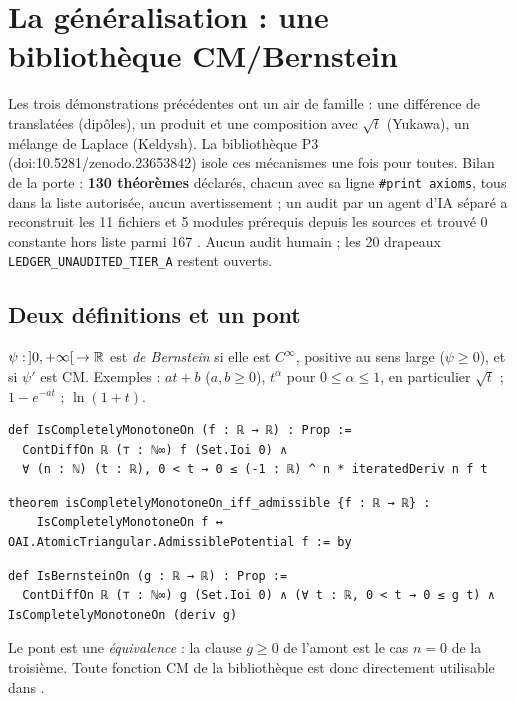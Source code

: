 \section{La généralisation : une bibliothèque CM/Bernstein}\label{ch2:sec:lib}

Les trois démonstrations précédentes ont un air de famille : une différence de translatées (dipôles), un produit et une
composition avec $\sqrt t$ (Yukawa), un mélange de Laplace (Keldysh). La bibliothèque P3~\cite{p3} (doi\string:10.5281/zenodo.23653842)
isole ces mécanismes une fois pour toutes. Bilan de la porte : \textbf{130 théorèmes} déclarés, chacun avec sa ligne
\texttt{\#print axioms}, tous dans la liste autorisée, aucun avertissement ; un audit par un agent d'IA séparé a
reconstruit les 11 fichiers et 5 modules prérequis depuis les sources et trouvé 0 constante hors liste parmi 167
\tierA. Aucun audit humain ; les 20 drapeaux \texttt{LEDGER\_UNAUDITED\_TIER\_A} restent ouverts.

\subsection{Deux définitions et un pont}
\begin{definition}
$\psi:\,]0,+\infty[\,\to\mathbb{R}$ est \emph{de Bernstein} si elle est $C^\infty$, positive au sens large ($\psi\ge0$), et si $\psi'$ est CM.
Exemples : $at+b$ ($a,b\ge0$), $t^\alpha$ pour $0\le\alpha\le1$, en particulier $\sqrt t$ ; $1-e^{-at}$ ; $\ln(1+t)$.
\end{definition}
\begin{leanbox}
\begin{lstlisting}[style=chdeux]
def IsCompletelyMonotoneOn (f : ℝ → ℝ) : Prop :=
  ContDiffOn ℝ (⊤ : ℕ∞) f (Set.Ioi 0) ∧
  ∀ (n : ℕ) (t : ℝ), 0 < t → 0 ≤ (-1 : ℝ) ^ n * iteratedDeriv n f t
\end{lstlisting}
\begin{lstlisting}[style=chdeux]
theorem isCompletelyMonotoneOn_iff_admissible {f : ℝ → ℝ} :
    IsCompletelyMonotoneOn f ↔ OAI.AtomicTriangular.AdmissiblePotential f := by
\end{lstlisting}
\begin{lstlisting}[style=chdeux]
def IsBernsteinOn (g : ℝ → ℝ) : Prop :=
  ContDiffOn ℝ (⊤ : ℕ∞) g (Set.Ioi 0) ∧ (∀ t : ℝ, 0 < t → 0 ≤ g t) ∧ IsCompletelyMonotoneOn (deriv g)
\end{lstlisting}
\end{leanbox}
\noindent Le pont  est une \emph{équivalence} \tierA : la clause $g\ge0$ de
l'amont est le cas $n=0$ de la troisième. Toute fonction CM de la bibliothèque est donc directement utilisable dans
.

